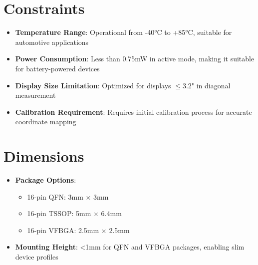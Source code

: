 \section{Constraints}

\begin{itemize}
	\item \textbf{Temperature Range}: Operational from -40°C to +85°C, suitable for automotive applications \cite{Allelco:2023}
	\item \textbf{Power Consumption}: Less than 0.75mW in active mode, making it suitable for battery-powered devices
	\item \textbf{Display Size Limitation}: Optimized for displays $\leq 3.2$" in diagonal measurement \cite{Allelco:2023}
	\item \textbf{Calibration Requirement}: Requires initial calibration process for accurate coordinate mapping
\end{itemize}

\section{Dimensions}

\begin{itemize}
	\item \textbf{Package Options}:
	\begin{itemize}
		\item 16-pin QFN: 3mm × 3mm
		\item 16-pin TSSOP: 5mm × 6.4mm
		\item 16-pin VFBGA: 2.5mm × 2.5mm \cite{Allelco:2023}
	\end{itemize}
	\item \textbf{Mounting Height}: <1mm for QFN and VFBGA packages, enabling slim device profiles
\end{itemize}

